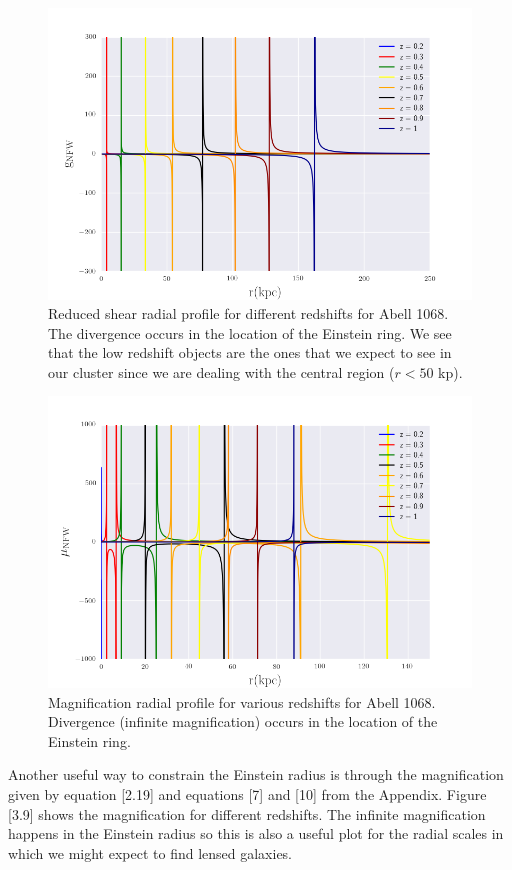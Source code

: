 \begin{figure}[]
\centering
\includegraphics[width=12cm]{images/Reduced_Shear.png}
\caption[Reduced shear radial]{Reduced shear radial profile for different redshifts for Abell 1068. The divergence occurs in the location of the Einstein ring. We see that the low redshift objects are the ones that we expect to see in our cluster since we are dealing with the central region ($r<50$ kp).}
\end{figure}

\begin{figure}[H]
\centering
\includegraphics[width=12cm]{images/Magnification.png}
\caption[Magnification radial profile]{Magnification radial profile for various redshifts for Abell 1068. Divergence (infinite magnification) occurs in the location of the Einstein ring.}
\end{figure}

Another useful way to constrain the Einstein radius is through the magnification given by equation [2.19] and equations [7] and [10] from the Appendix. Figure [3.9] shows the magnification for different redshifts. The infinite magnification happens in the Einstein radius so this is also a useful plot for the radial scales in which we might expect to find lensed galaxies.

